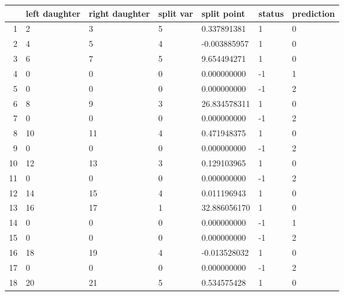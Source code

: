 \documentclass[11pt]{article}
\begin{document}
    \begin{tabular}{r|llllll}
  & left daughter & right daughter & split var & split point & status & prediction\\
\hline
	1 &  2           &  3           & 5            &  0.337891381 &  1           & 0           \\
	2 &  4           &  5           & 4            & -0.003885957 &  1           & 0           \\
	3 &  6           &  7           & 5            &  9.654494271 &  1           & 0           \\
	4 &  0           &  0           & 0            &  0.000000000 & -1           & 1           \\
	5 &  0           &  0           & 0            &  0.000000000 & -1           & 2           \\
	6 &  8           &  9           & 3            & 26.834578311 &  1           & 0           \\
	7 &  0           &  0           & 0            &  0.000000000 & -1           & 2           \\
	8 & 10           & 11           & 4            &  0.471948375 &  1           & 0           \\
	9 &  0           &  0           & 0            &  0.000000000 & -1           & 2           \\
	10 & 12           & 13           & 3            &  0.129103965 &  1           & 0           \\
	11 &  0           &  0           & 0            &  0.000000000 & -1           & 2           \\
	12 & 14           & 15           & 4            &  0.011196943 &  1           & 0           \\
	13 & 16           & 17           & 1            & 32.886056170 &  1           & 0           \\
	14 &  0           &  0           & 0            &  0.000000000 & -1           & 1           \\
	15 &  0           &  0           & 0            &  0.000000000 & -1           & 2           \\
	16 & 18           & 19           & 4            & -0.013528032 &  1           & 0           \\
	17 &  0           &  0           & 0            &  0.000000000 & -1           & 2           \\
	18 & 20           & 21           & 5            &  0.534575428 &  1           & 0           \\

\end{tabular}
\end{document}
